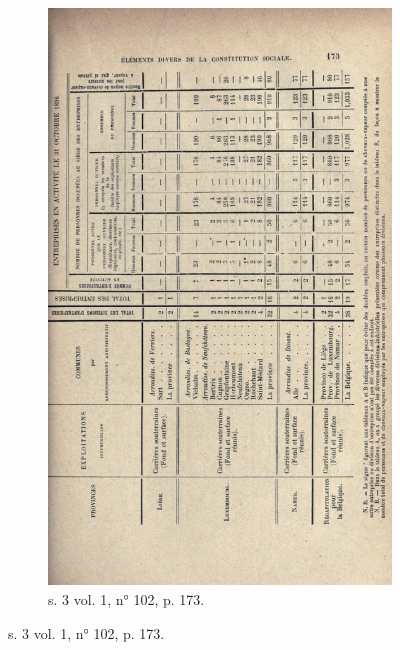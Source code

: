 \begin{figure}
\begin{subfigure}[t]{0.4\textwidth}
     \includegraphics[width=0.8\linewidth]{img/tabl_s3t1_m102_p173.png}
     \caption{s. 3 vol. 1, n° 102, p. 173.}
    \end{subfigure}
    \hspace{5pt}
    
    
    

\end{figure}
